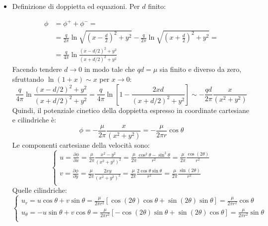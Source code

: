 \begin{itemize}
\item Definizione di doppietta ed equazioni. Per $d$ finito:

  \begin{equation}
  \begin{aligned}
    \phi & = \phi^+ + \phi^- = \\
    & = \frac{q}{2\pi}\ln{\sqrt{\displaystyle\left( x - \frac{d}{2} \right)^2 + y^2}} - 
    \frac{q}{2\pi}\ln{\sqrt{\displaystyle\left( x + \frac{d}{2} \right)^2 + y^2}} = \\
    & = \frac{q}{4\pi}\ln{\frac{( x - d/2 )^2 + y^2}{( x + d/2 )^2 + y^2}}
  \end{aligned}
  \end{equation}
Facendo tendere $ d \to 0$ in modo tale che $qd = \mu$ sia finito e diverso da zero, sfruttando $\ln(1+x)\sim x$ per $x \to 0$:
\begin{equation}
  \frac{q}{4\pi}\ln{\frac{( x - d/2 )^2 + y^2}{( x + d/2 )^2 + y^2}} = 
  \frac{q}{4\pi}\ln\displaystyle\left[1- \frac{2xd}{( x + d/2 )^2 + y^2}\right] \sim
  -\frac{qd}{2\pi}\frac{x}{(x^2 + y^2)}
\end{equation}
Quindi, il potenziale cinetico della doppietta espresso in coordinate cartesiane e cilindriche è:
\begin{equation}
  \phi = -\frac{\mu}{2\pi}\frac{x}{(x^2 + y^2)} = -\frac{\mu}{2\pi r}\cos \theta
\end{equation}
Le componenti cartesiane della velocità sono:
\begin{equation}
 \begin{cases}
  u = \frac{\partial \phi}{\partial x} = \frac{\mu}{2\pi}\frac{x^2 - y^2}{(x^2 + y^2)^2} =  \frac{\mu}{2\pi}\frac{\cos^2 \theta - \sin^2 \theta}{r^2} = \frac{\mu}{2\pi}\frac{\cos(2\theta)}{r^2} \\
  v = \frac{\partial \phi}{\partial y} = \frac{\mu}{2\pi}\frac{2xy}{(x^2 + y^2)^2} =  \frac{\mu}{2\pi}\frac{2\cos \theta \sin \theta}{r^2} = \frac{\mu}{2\pi}\frac{\sin(2\theta)}{r^2} \\
 \end{cases}
\end{equation}
Quelle cilindriche:
\begin{equation}
 \begin{cases}
  u_r = u \cos\theta + v \sin\theta = 
  \frac{\mu}{2\pi r^2}[\cos(2\theta)\cos\theta + 
  \sin(2\theta)\sin\theta ] = 
  \frac{\mu}{2\pi r^2} \cos\theta\\
  u_\theta = -u \sin\theta + v \cos\theta = 
  \frac{\mu}{2\pi r^2}[- \cos(2\theta)\sin\theta + 
  \sin(2\theta)\cos\theta] = 
  \frac{\mu}{2\pi r^2} \sin\theta\\
 \end{cases}
\end{equation}


\end{itemize}
